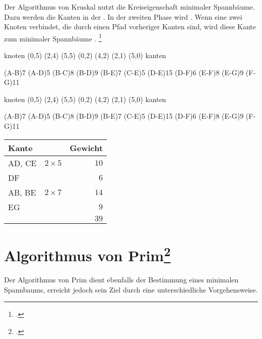 \documentclass{lehramt-informatik-haupt}
\begin{document}
Der Algorithmus von Kruskal nutzt die Kreiseigenschaft minimaler
Spannbäume. Dazu werden die Kanten in der 
. In der zweiten Phase
wird . Wenn eine
 zwei Knoten verbindet, die  durch einen
Pfad vorheriger Kanten  sind, wird diese Kante zum
minimaler Spannbäume .
\footcite{wiki:kruskal}

\def\TmpGraph#1{
  \graph knoten {
    \knoten{A}(0,5)
    \knoten{B}(2,4)
    \knoten{C}(5,5)
    \knoten{D}(0,2)
    \knoten{E}(4,2)
    (2,1)
    (5,0)
  } kanten {
    #1
  }
}

\TmpGraph{
  \kante(A-B){7}
  \kante(A-D){5}
  \kante(B-C){8}
  \kante(B-D){9}
  \kante(B-E){7}
  \kante(C-E){5}
  \kante(D-E){15}
  \kante(D-F){6}
  \kante(E-F){8}
  \kante(E-G){9}
  \kante(F-G){11}
}

\begin{minipage}{7cm}
\TmpGraph{
  \KANTE(A-B){7}
  \KANTE(A-D){5}
  \kante(B-C){8}
  \kante(B-D){9}
  \KANTE(B-E){7}
  \KANTE(C-E){5}
  \kante(D-E){15}
  \KANTE(D-F){6}
  \kante(E-F){8}
  \KANTE(E-G){9}
  \kante(F-G){11}
}
\end{minipage}
\begin{minipage}{4cm}
\begin{center}
\begin{tabular}{|l|l|r|}
\hline
Kante & & Gewicht\\\hline\hline
AD, CE & $2 \times 5$ & $10$\\
DF     &              & $6$\\
AB, BE & $2 \times 7$ & $14$\\
EG     &              & $9$\\\hline
       &              & $39$\\\hline
\end{tabular}
\end{center}
\end{minipage}

%

\section{Algorithmus von Prim\footcite{wiki:prim}}

Der Algorithmus von Prim dient ebenfalls der Bestimmung eines minimalen
Spannbaums, erreicht jedoch sein Ziel durch eine unterschiedliche
Vorgehensweise.
\end{document}
